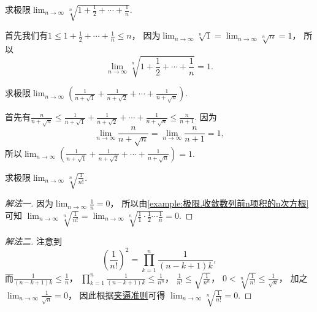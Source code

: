 \begin{example}
求极限\(\lim_{n\to\infty} \sqrt[n]{1+\frac12+\dotsb+\frac1n}\).
\begin{solution}
首先我们有\(1 \leq 1+\frac12+\dotsb+\frac1n \leq n\)，
因为\(\lim_{n\to\infty} \sqrt[n]{1} = \lim_{n\to\infty} \sqrt[n]{n} = 1\)，
所以\[
	\lim_{n\to\infty} \sqrt[n]{1+\frac12+\dotsb+\frac1n} = 1.
\]
\end{solution}
\end{example}

\begin{example}
求极限\(\lim_{n\to\infty} \left(\frac1{n+\sqrt1}+\frac1{n+\sqrt2}+\dotsb+\frac1{n+\sqrt{n}}\right)\).
\begin{solution}
首先有\(\frac{n}{n+\sqrt{n}}
\leq \frac1{n+\sqrt1}+\frac1{n+\sqrt2}+\dotsb+\frac1{n+\sqrt{n}}
\leq \frac{n}{n+1}\).
因为\[
	\lim_{n\to\infty} \frac{n}{n+\sqrt{n}}
	= \lim_{n\to\infty} \frac{n}{n+1} = 1,
\]
所以\(\lim_{n\to\infty} \left(\frac1{n+\sqrt1}+\frac1{n+\sqrt2}+\dotsb+\frac1{n+\sqrt{n}}\right) = 1\).
\end{solution}
\end{example}

\begin{example}
求极限\(\lim_{n\to\infty} \sqrt[n]{\frac1{n!}}\).
\begin{solution}\let\qed\relax
\begin{proof}[解法一]
因为\(\lim_{n\to\infty} \frac1n = 0\)，
所以由\cref{example:极限.收敛数列前n项积的n次方根} 可知
\(\lim_{n\to\infty} \sqrt[n]{\frac1{n!}}
= \lim_{n\to\infty} \sqrt[n]{\frac11 \cdot \frac12 \dotsm \frac1n}
= 0\).
\end{proof}
\begin{proof}[解法二]
注意到\[
	\left(\frac1{n!}\right)^2
	= \prod_{k=1}^n \frac1{(n-k+1)k},%
\]
而\(\frac1{(n-k+1)k} \leq \frac1n\)，
\(\prod_{k=1}^n \frac1{(n-k+1)k} \leq \frac1{n^n}\)，
\(\frac1{n!} \leq \sqrt{\frac1{n^n}}\)，
\(0 < \sqrt[n]{\frac1{n!}} \leq \frac1{\sqrt{n}}\)，
加之\(\lim_{n\to\infty} \frac1{\sqrt{n}} = 0\)，
因此根据\hyperref[theorem:数列极限.夹逼准则]{夹逼准则}可得
\(\lim_{n\to\infty} \sqrt[n]{\frac1{n!}} = 0\).
\end{proof}
\end{solution}
\end{example}

